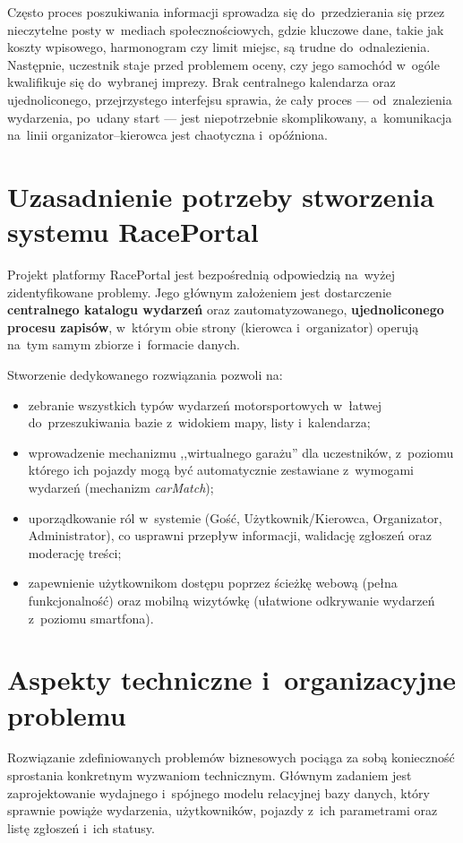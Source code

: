 \documentclass{sprz}
\begin{document}
Często proces poszukiwania informacji sprowadza się do~przedzierania się przez nieczytelne posty w~mediach społecznościowych, gdzie kluczowe dane, takie jak koszty wpisowego, harmonogram czy limit miejsc, są trudne do~odnalezienia. Następnie, uczestnik staje przed problemem oceny, czy jego samochód w~ogóle kwalifikuje się do~wybranej imprezy. Brak centralnego kalendarza oraz ujednoliconego, przejrzystego interfejsu sprawia, że cały proces --- od~znalezienia wydarzenia, po~udany start --- jest niepotrzebnie skomplikowany, a~komunikacja na~linii organizator--kierowca jest chaotyczna i~opóźniona.

\section{Uzasadnienie potrzeby stworzenia systemu RacePortal}
Projekt platformy RacePortal jest bezpośrednią odpowiedzią na~wyżej zidentyfikowane problemy. Jego głównym założeniem jest dostarczenie \textbf{centralnego katalogu wydarzeń} oraz zautomatyzowanego, \textbf{ujednoliconego procesu zapisów}, w~którym obie strony (kierowca i~organizator) operują na~tym samym zbiorze i~formacie danych.

Stworzenie dedykowanego rozwiązania pozwoli na:
\begin{itemize}
  \item zebranie wszystkich typów wydarzeń motorsportowych w~łatwej do~przeszukiwania bazie z~widokiem mapy, listy i~kalendarza;
  \item wprowadzenie mechanizmu ,,wirtualnego garażu'' dla uczestników, z~poziomu którego ich pojazdy mogą być automatycznie zestawiane z~wymogami wydarzeń (mechanizm \emph{carMatch});
  \item uporządkowanie ról w~systemie (Gość, Użytkownik/Kierowca, Organizator, Administrator), co usprawni przepływ informacji, walidację zgłoszeń oraz moderację treści;
  \item zapewnienie użytkownikom dostępu poprzez ścieżkę webową (pełna funkcjonalność) oraz mobilną wizytówkę (ułatwione odkrywanie wydarzeń z~poziomu smartfona).
\end{itemize}

\section{Aspekty techniczne i~organizacyjne problemu}
Rozwiązanie zdefiniowanych problemów biznesowych pociąga za sobą konieczność sprostania konkretnym wyzwaniom technicznym. Głównym zadaniem jest zaprojektowanie wydajnego i~spójnego modelu relacyjnej bazy danych, który sprawnie powiąże wydarzenia, użytkowników, pojazdy z~ich parametrami oraz listę zgłoszeń i~ich statusy.
\end{document}
